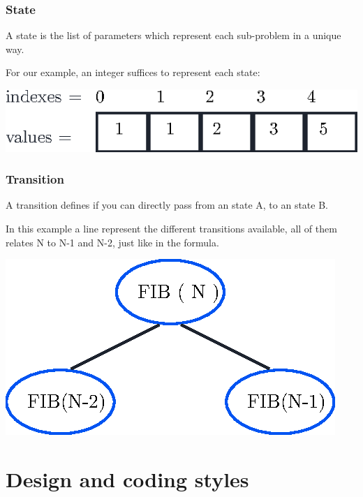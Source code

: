 \documentclass[article]{beamer}
\begin{document}
\begin{frame}
	\frametitle{State}
		A state is the list of parameters which represent each sub-problem in a unique way.
		
		\vspace{8mm}
		
		For our example, an integer suffices to represent each state:
		\begin{center}
			\includegraphics[scale=0.9]{./figures/fib_series.eps}
		\end{center}
		
\end{frame}

\begin{frame}
	\frametitle{Transition}
		A transition defines if you can directly pass from an state A, to an state B.
		
		\vspace{8mm}
		
		In this example a line represent the different transitions available, all of them relates N to N-1 and N-2, just like in the formula.
		\begin{center}
			\includegraphics[scale=0.9]{./figures/transitions.eps}
		\end{center}
\end{frame}

\section{Design and coding styles}
\end{document}
